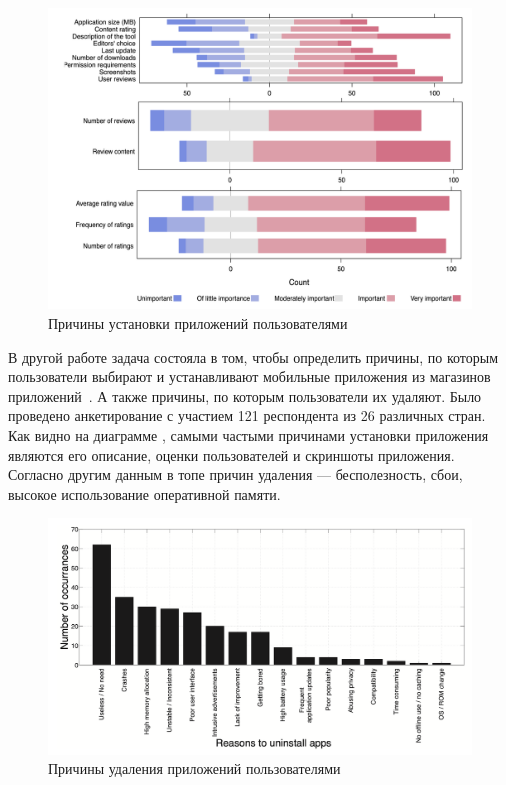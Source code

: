 \documentclass[a4paper,14pt]{extarticle} %
\begin{document}
	\begin{figure}[htb]
		\includegraphics[width=\textwidth]{install_reasons}
		\caption{Причины установки приложений пользователями}
		\label{fig:install_reasons}
	\end{figure}
	
	В другой работе задача состояла в том, чтобы определить причины, по которым пользователи выбирают и устанавливают мобильные приложения из магазинов приложений~\parencite{ickin2017users}. А также причины, по которым пользователи их удаляют. Было проведено анкетирование с участием 121 респондента из 26 различных стран. Как видно на диаграмме \ris{\ref{fig:install_reasons}}, самыми частыми причинами установки приложения являются его описание, оценки пользователей и скриншоты приложения. Согласно другим данным \ris{\ref{fig:delete_reasons}} в топе причин удаления --- бесполезность, сбои, высокое использование оперативной памяти.
	
	\begin{figure}[htb]
		\includegraphics[width=\textwidth]{delete_reasons}
		\caption{Причины удаления приложений пользователями}
		\label{fig:delete_reasons}
	\end{figure}
	
\end{document}
